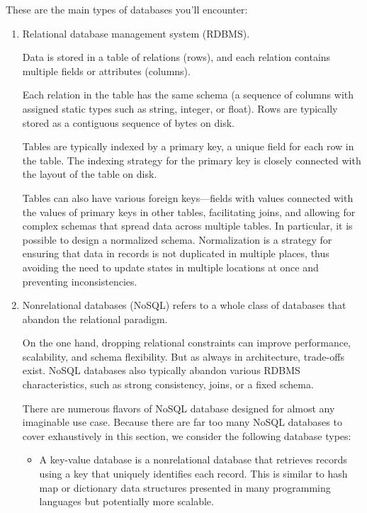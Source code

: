 These are the main types of databases you'll encounter:
\begin{enumerate}
    \item Relational database management system (RDBMS). 
    
    Data is stored in a table of relations (rows), and each
    relation contains multiple fields or attributes (columns).

    Each relation in the table has the same schema (a sequence
    of columns with assigned static types such as string, integer,
    or float). Rows are typically stored as a contiguous sequence
    of bytes on disk.

    Tables are typically indexed by a primary key, a unique field
    for each row in the table. The indexing strategy for the
    primary key is closely connected with the layout of the table
    on disk.

    Tables can also have various foreign keys—fields with values
    connected with the values of primary keys in other tables,
    facilitating joins, and allowing for complex schemas that
    spread data across multiple tables. In particular, it is
    possible to design a normalized schema. Normalization is a
    strategy for ensuring that data in records is not duplicated
    in multiple places, thus avoiding the need to update states
    in multiple locations at once and preventing inconsistencies.


    \item Nonrelational databases (NoSQL) refers to a whole class
    of databases that abandon the relational paradigm.

    On the one hand, dropping relational constraints can improve
    performance, scalability, and schema flexibility. But as
    always in architecture, trade-offs exist. NoSQL databases
    also typically abandon various RDBMS characteristics, such
    as strong consistency, joins, or a fixed schema.

    There are numerous flavors of NoSQL database designed for
    almost any imaginable use case. Because there are far too
    many NoSQL databases to cover exhaustively in this section,
    we consider the following database types:
    \begin{itemize}
        \item A key-value database is a nonrelational database
        that retrieves records using a key that uniquely
        identifies each record. This is similar to hash
        map or dictionary data structures presented in many
        programming languages but potentially more scalable.


\end{itemize}
\end{enumerate}
